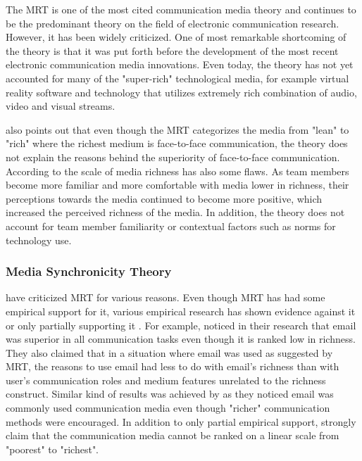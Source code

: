 \documentclass[english,12pt,a4paper,pdftex]{article}
\begin{document}
The \ac{MRT} is one of the most cited communication media theory and continues to be the predominant theory on the field of electronic communication research. However, it has been widely criticized. One of most remarkable shortcoming of the theory is that it was put forth before the development of the most recent electronic communication media innovations. Even today, the theory has not yet accounted for many of the "super-rich" technological media, for example virtual reality software and technology that utilizes extremely rich combination of audio, video and visual streams. \citep{derosa2004}

\citet{derosa2004} also points out that even though the \ac{MRT} categorizes the media from "lean" to "rich" where the richest medium is face-to-face communication, the theory does not explain the reasons behind the superiority of face-to-face communication. According to \citet{derosa2004} the scale of media richness has also some flaws. As team members become more familiar and more comfortable with media lower in richness, their perceptions towards the media continued to become more positive, which increased the perceived richness of the media. In addition, the theory does not account for team member familiarity or contextual factors such as norms for technology use.

\subsubsection{Media Synchronicity Theory}

\citet{dennis1999} have criticized MRT for various reasons. Even though MRT has had some empirical support for it, various empirical research has shown evidence against it or only partially supporting it \citep{dennis1998} \citep{elshinnawy1997}. For example, \citet{elshinnawy1997} noticed in their research that email was superior in all communication tasks even though it is ranked low in richness. They also claimed that in a situation where email was used as suggested by MRT, the reasons to use email had less to do with email's richness than with user's communication roles and medium features unrelated to the richness construct. Similar kind of results was achieved by \citet{korkala2006} as they noticed email was commonly used communication media even though "richer" communication methods were encouraged. In addition to only partial empirical support, \citet{dennis1999} strongly claim that the communication media cannot be ranked on a linear scale from "poorest" to "richest".
\end{document}
